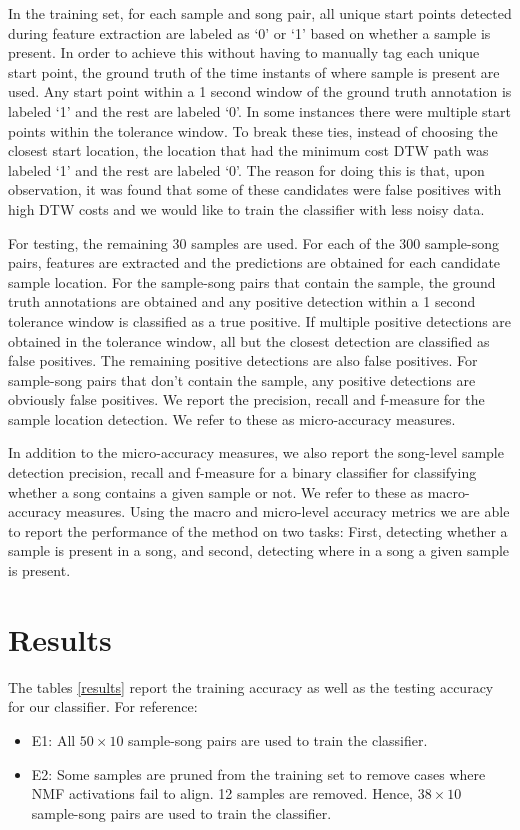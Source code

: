 \documentclass{article}
\begin{document}
In the training set, for each sample and song pair, all unique start points detected during feature extraction are labeled as `0' or `1' based on whether a sample is present. In order to achieve this without having to manually tag each unique start point, the ground truth of the time instants of where sample is present are used. Any start point within a 1 second window of the ground truth annotation is labeled `1' and the rest are labeled `0'. In some instances there were multiple start points within the tolerance window. To break these ties, instead of choosing the closest start location, the location that had the minimum cost DTW path was labeled `1' and the rest are labeled `0'. The reason for doing this is that, upon observation, it was found that some of these candidates were false positives with high DTW costs and we would like to train the classifier with less noisy data.

For testing, the remaining 30 samples are used. For each of the 300 sample-song pairs, features are extracted and the predictions are obtained for each candidate sample location. For the sample-song pairs that contain the sample, the ground truth annotations are obtained and any positive detection within a 1 second tolerance window is classified as a true positive. If multiple positive detections are obtained in the tolerance window, all but the closest detection are classified as false positives. The remaining positive detections are also false positives. For sample-song pairs that don't contain the sample, any positive detections are obviously false positives. We report the precision, recall and f-measure for the sample location detection. We refer to these as micro-accuracy measures.

In addition to the micro-accuracy measures, we also report the song-level sample detection precision, recall and f-measure for a binary classifier for classifying whether a song contains a given sample or not. We refer to these as macro-accuracy measures. Using the macro and micro-level accuracy metrics we are able to report the performance of the method on two tasks: First, detecting whether a sample is present in a song, and second, detecting where in a song a given sample is present.

\section{Results}

The tables \ref{results} report the training accuracy as well as the testing accuracy for our classifier. For reference:
\begin{itemize}
\item E1: All $50 \times 10$ sample-song pairs are used to train the classifier.
\item E2: Some samples are pruned from the training set to remove cases where NMF activations fail to align. 12 samples are removed. Hence, $38 \times 10$ sample-song pairs are used to train the classifier.
\end{itemize}
\end{document}
